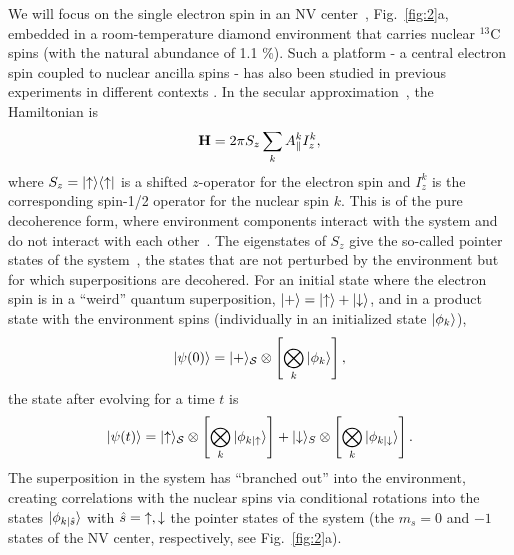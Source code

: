 \documentclass[aps,prl,floatfix,twocolumn,footinbib,superscriptaddress]{revtex4-1}
\begin{document}
We will focus on the single electron spin in an NV center~\cite{DOHERTY20131,PSSA:PSSA200671403}, Fig.~\ref{fig:2}a, embedded in a room-temperature diamond environment that carries nuclear $^{13}$C spins (with the natural abundance of 1.1 \%). Such a platform - a central electron spin coupled to nuclear ancilla spins - has also been studied in previous experiments in different contexts \cite{Taminiau14,Hirose16,Zaiser16}. In the secular approximation~\cite{Childress281}, the Hamiltonian is 
\begin{equation}
\mathbf{H} = 2\pi S_z\sum_k A^k_\parallel I^k_z ,
\label{eq:H0}
\end{equation}
where $S_z = |\mathord{\uparrow}\rangle\langle\mathord{\uparrow}|$ is a shifted $z$-operator for the electron spin and $I^k_z$ is the corresponding spin-1/2 operator for the nuclear spin $k$. This is of the pure decoherence form, where environment components interact with the system and do not interact with each other~\cite{Zwolak14,zwolak16,Riedel12-1}. The eigenstates of $S_z$ give the so-called pointer states of the system~\cite{Zurek81-1}, the states that are not perturbed by the environment but for which superpositions are decohered. For an initial state where the electron spin is in a ``weird'' quantum superposition, $|+\rangle=|\mathord{\uparrow}\rangle+|\mathord{\downarrow}\rangle$, and in a product state with the environment spins (individually in an initialized state $|\phi_k\rangle$), 
\begin{equation}
|\psi(0)\rangle = |+\rangle_{\mathcal{S}} \otimes \left[ \bigotimes_k |\phi_k\rangle \right],
\label{eq:Psi0}
\end{equation}
the state after evolving for a time $t$ is
\begin{equation}
|\psi(t)\rangle = |\mathord{\uparrow}\rangle_{\mathcal{S}} \otimes \left[ \bigotimes_k |\phi_{k|\mathord{\uparrow}}\rangle \right] + |\mathord{\downarrow}\rangle_S \otimes \left[ \bigotimes_k |\phi_{k|\mathord{\downarrow}}\rangle \right].
\label{eq:GHZ}
\end{equation}
The superposition in the system has ``branched out'' into the environment, creating correlations with the nuclear spins via conditional rotations into the states $|\phi_{k|\hat{s}}\rangle$ with $\hat{s}=\mathord{\uparrow},\mathord{\downarrow}$ the pointer states of the system (the $m_s =0$ and $-1$ states of the NV center, respectively, see Fig.~\ref{fig:2}a). 
\end{document}
